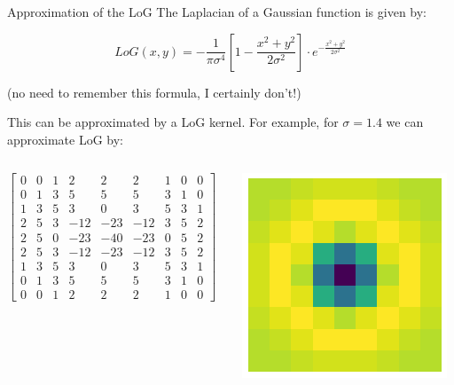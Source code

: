 \documentclass[9pt, aspectratio=169]{beamer}
\begin{document}
\begin{frame}
    {Approximation of the LoG}
    The Laplacian of a Gaussian function is given by:

    \Large
    $$LoG(x,y) = -\frac{1}{\pi \sigma^4}[1-\frac{x^2+y^2}{2\sigma^2}]\cdot e^{-\frac{x^2+y^2}{2\sigma^2}}$$

    \normalsize
    \centering
    (no need to remember this formula, I certainly don't!)\\
    \pause

    This can be approximated by a LoG kernel. For example, for $\sigma = 1.4$ we can approximate LoG by:

    \begin{columns}
        \begin{column}{.4\textwidth}
            \small
            $\begin{bmatrix}0 & 0 & 1 & 2   & 2   & 2   & 1 & 0 & 0 \\
                    0 & 1 & 3 & 5   & 5   & 5   & 3 & 1 & 0 \\
                    1 & 3 & 5 & 3   & 0   & 3   & 5 & 3 & 1 \\
                    2 & 5 & 3 & -12 & -23 & -12 & 3 & 5 & 2 \\
                    2 & 5 & 0 & -23 & -40 & -23 & 0 & 5 & 2 \\
                    2 & 5 & 3 & -12 & -23 & -12 & 3 & 5 & 2 \\
                    1 & 3 & 5 & 3   & 0   & 3   & 5 & 3 & 1 \\
                    0 & 1 & 3 & 5   & 5   & 5   & 3 & 1 & 0 \\
                    0 & 0 & 1 & 2   & 2   & 2   & 1 & 0 & 0\end{bmatrix}$
        \end{column}
        \begin{column}{.3\textwidth}
            \centering
            \includegraphics[width=.9\textwidth]{LoG kernel.png}

\end{column}
\end{columns}
\end{frame}
\end{document}
